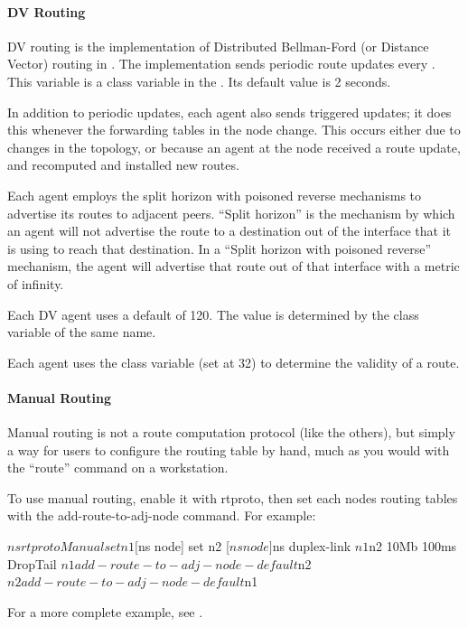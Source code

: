 \paragraph{DV Routing}
DV routing is the implementation of
Distributed Bellman-Ford (or Distance Vector) routing in \ns.
The implementation sends periodic route updates every .
This variable is a class variable in the .
Its default value is 2 seconds.

In addition to periodic updates, each agent also sends triggered updates;
it does this whenever the forwarding tables in the node change.
This occurs either due to changes in the topology, 
or because an agent at the node received a route update,
and recomputed and installed new routes.

Each agent employs the split horizon with poisoned reverse mechanisms
to advertise its routes to adjacent peers.
``Split horizon'' is the mechanism by which an agent will not advertise
the route to a destination out of the interface that it is using to
reach that destination.
In a ``Split horizon with poisoned reverse'' mechanism,
the agent will advertise that route out of that interface with 
a metric of infinity.

Each DV agent uses a default  of 120.
The value is determined by the class variable of the same name.

Each agent uses the class variable  (set at 32)
to determine the validity of a route.


\paragraph{Manual Routing}
Manual routing is not a route computation protocol (like the others),
  but simply a way for users to configure the routing table by hand,
  much as you would with the ``route'' command on a workstation.

To use manual routing, enable it with rtproto, then set each
nodes routing tables with the add-route-to-adj-node command.
For example:
\begin{program}
$ns rtproto Manual
set n1 [$ns node]
set n2 [$ns node]
$ns duplex-link $n1 $n2 10Mb 100ms DropTail
$n1 add-route-to-adj-node -default $n2
$n2 add-route-to-adj-node -default $n1
\end{program}

For a more complete example, see .


